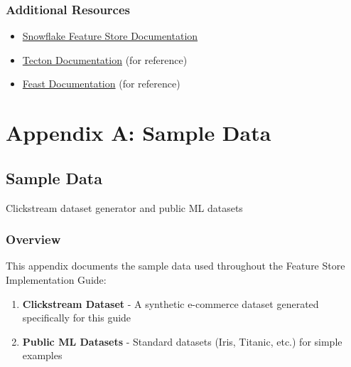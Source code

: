 \documentclass[
  letterpaper,
  DIV=11,
  numbers=noendperiod]{scrreprt}
\providecommand{\tightlist}{%
  \setlength{\itemsep}{0pt}\setlength{\parskip}{0pt}}\usepackage{longtable,booktabs,array}
\begin{document}
\hypertarget{additional-resources}{%
\section{Additional Resources}\label{additional-resources}}

\begin{itemize}
\tightlist
\item
  \href{https://docs.snowflake.com/en/developer-guide/snowflake-ml/feature-store}{Snowflake
  Feature Store Documentation}
\item
  \href{https://docs.tecton.ai/}{Tecton Documentation} (for reference)
\item
  \href{https://docs.feast.dev/}{Feast Documentation} (for reference)
\end{itemize}

\cleardoublepage
{}
{}
\appendix

\part{Appendix A: Sample Data}

\hypertarget{sample-data-1}{%
\chapter{Sample Data}\label{sample-data-1}}

Clickstream dataset generator and public ML datasets

\hfill\break

\hypertarget{overview-14}{%
\section{Overview}\label{overview-14}}

This appendix documents the sample data used throughout the Feature
Store Implementation Guide:

\begin{enumerate}
\def\labelenumi{\arabic{enumi}.}
\tightlist
\item
  \textbf{Clickstream Dataset} - A synthetic e-commerce dataset
  generated specifically for this guide
\item
  \textbf{Public ML Datasets} - Standard datasets (Iris, Titanic, etc.)
  for simple examples
\end{enumerate}
\end{document}
